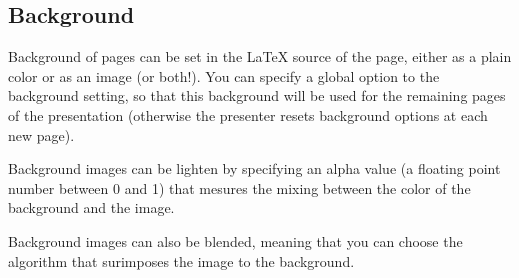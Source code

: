 \documentclass[12pt]{article}
\begin{document}
\subsection {Background}

Background of pages can be set in the {\LaTeX} source of the page,
either as a plain color or as an image (or both!).
You can specify a global option to the background setting, so that this
background will be used for the remaining pages of the presentation
(otherwise the presenter resets background options at each new page).

Background images can be lighten by specifying an alpha value (a
floating point number between 0 and 1) that mesures the mixing
between the color of the background and the image.

Background images can also be blended, meaning that you can choose the
algorithm that surimposes the image to the background.
\end{document}
